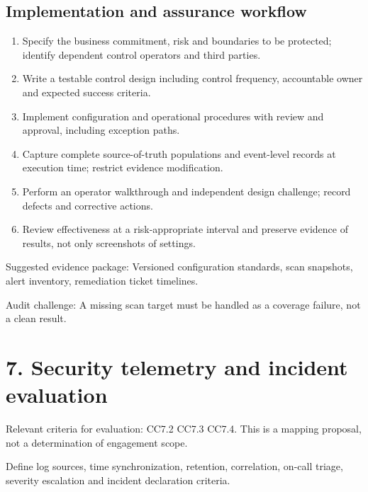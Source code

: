 \documentclass[10pt,oneside]{report}
\begin{document}
\subsection{Implementation and assurance workflow}
\begin{enumerate}
\item Specify the business commitment, risk and boundaries to be protected; identify dependent control operators and third parties.
\item Write a testable control design including control frequency, accountable owner and expected success criteria.
\item Implement configuration and operational procedures with review and approval, including exception paths.
\item Capture complete source-of-truth populations and event-level records at execution time; restrict evidence modification.
\item Perform an operator walkthrough and independent design challenge; record defects and corrective actions.
\item Review effectiveness at a risk-appropriate interval and preserve evidence of results, not only screenshots of settings.
\end{enumerate}

Suggested evidence package: Versioned configuration standards, scan snapshots, alert inventory, remediation ticket timelines.

Audit challenge: A missing scan target must be handled as a coverage failure, not a clean result.

\section{7. Security telemetry and incident evaluation}
Relevant criteria for evaluation: CC7.2 CC7.3 CC7.4. This is a mapping proposal, not a determination of engagement scope.

\begin{engineeringbox}
Define log sources, time synchronization, retention, correlation, on-call triage, severity escalation and incident declaration criteria.
\end{engineeringbox}
\end{document}
